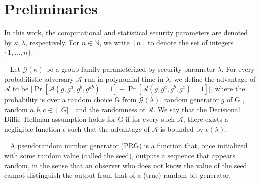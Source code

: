\documentclass[11pt]{article} %
\newcommand{\adv}{\ensuremath{\mathcal{A}} }
\newcommand{\remove}[1]{}
\newcommand{\G}{G }
\newcommand{\abs}[1]{\lvert#1\rvert}
\begin{document}
\section{Preliminaries}


In this work, the computational and statistical security parameters are denoted by $\kappa, \lambda$, respectively. For $n \in \mathbb{N}$, we write $[n]$ to denote the set of integers $\{1, \ldots, n\}$. %


\label{subs:crypto_prelim}

	\begin{definition}~\cite{Diffie:2006:NDC:2263321.2269104}
		Let $\mathcal{G}(\kappa)$ be a group family parameterized by security parameter $\lambda$. For every probabilistic adversary $\adv$ run in polynomial time in $\lambda$, we define the advantage of $\adv$ to be
		$\abs{\Pr[\adv(g,g^a,g^b,g^{ab})=1]-\Pr[\adv(g,g^a,g^b,g^c)=1]}$, where the probability is over a random choice \G from $\mathcal{G}(\lambda)$, random generator $g$ of \G, random $a, b, c \in [|G|]$ and the randomness of $\adv$. We say that the Decisional Diffie–Hellman assumption holds for \G if for every such $\adv$, there exists a negligible function $\epsilon$ such that the advantage of $\adv$ is bounded by $\epsilon(\lambda)$.
	\end{definition}

\begin{definition}~\cite{Koeune2011} A pseudorandom number generator (PRG) is a function that, once initialized with some random value (called the seed), outputs a sequence that appears random, in the sense that an observer who does not know the value of the seed cannot distinguish the output from that of a (true) random bit generator.
\end{definition}
\end{document}
